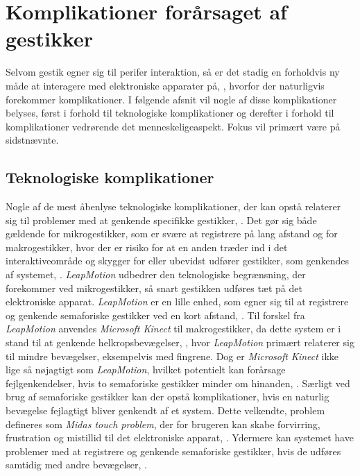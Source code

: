 \section{Komplikationer forårsaget af gestikker}
\label{KomplikationerGestikker}
%
Selvom gestik egner sig til perifer interaktion, så er det stadig en forholdvis ny måde at interagere med elektroniske apparater på, \parencite[s. 163]{PDF:ComparingInputModalities}, hvorfor der naturligvis forekommer komplikationer. I følgende afsnit vil nogle af disse komplikationer belyses, først i forhold til teknologiske komplikationer og derefter i forhold til komplikationer vedrørende det menneskeligeaspekt. Fokus vil primært være på sidstnævnte.
%
\subsection{Teknologiske komplikationer}
\label{TeknologiskeKomplikationer}
%
Nogle af de mest åbenlyse teknologiske komplikationer, der kan opstå relaterer sig til problemer med at genkende specifikke gestikker, \parencite[s. 27]{PDF:ATaxonomyOfGestures}. Det gør sig både gældende for mikrogestikker, som er svære at registrere på lang afstand og for makrogestikker, hvor der er risiko for at en anden træder ind i det interaktiveområde og skygger for eller ubevidst udfører gestikker, som genkendes af systemet, \parencite[s. 9]{PDF:UsabilityofMicroVsMacroGestures}. \textit{LeapMotion} udbedrer den teknologiske begrænsning, der forekommer ved mikrogestikker, så snart gestikken udføres tæt på det elektroniske apparat. \textit{LeapMotion} er en lille enhed, som egner sig til at registrere og genkende semaforiske gestikker ved en kort afstand, \parencite[s. 7]{PDF:UsabilityofMicroVsMacroGestures}. Til forskel fra \textit{LeapMotion} anvendes \textit{Microsoft Kinect} til makrogestikker, da dette system er i stand til at genkende helkropsbevægelser, \parencite[s. 4]{PDF:UsabilityofMicroVsMacroGestures}, hvor \textit{LeapMotion} primært relaterer sig til mindre bevægelser, eksempelvis med fingrene. Dog er \textit{Microsoft Kinect} ikke lige så nøjagtigt som \textit{LeapMotion}, hvilket potentielt kan forårsage fejlgenkendelser, hvis to semaforiske gestikker minder om hinanden, \parencite[s. 3]{PDF:UsabilityofMicroVsMacroGestures}. \blankline
%
Særligt ved brug af semaforiske gestikker kan der opstå komplikationer, hvis en naturlig bevægelse fejlagtigt bliver genkendt af et system. Dette velkendte, problem defineres som \textit{Midas touch problem}, der for brugeren kan skabe forvirring, frustration og mistillid til det elektroniske apparat, \parencite[s. 109]{PDF:PIMicrogesturesKap5}. Ydermere kan systemet have problemer med at registrere og genkende semaforiske gestikker, hvis de udføres samtidig med andre bevægelser, \parencite[s. 27]{PDF:ATaxonomyOfGestures}. 

